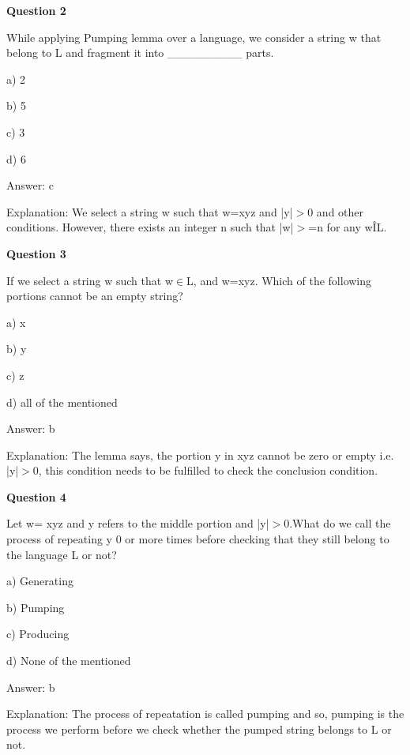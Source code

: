 \documentclass{article}
\begin{document}
\begin{mdframed}[linewidth=1pt, roundcorner=5pt, linecolor=gray!30, backgroundcolor=gray!5]
\textbf{Question 2} 

While applying Pumping lemma over a language, we consider a string w that belong to L and fragment it into \_\_\_\_\_\_\_\_\_ parts.

a) 2

b) 5

c) 3

d) 6
\vspace{5pt} \par
\begin{tcolorbox}[colback=green!5, colframe=green!40!black, title=Solution]
Answer: c

Explanation: We select a string w such that w=xyz and |y|$>$0 and other conditions. However, there exists an integer n such that |w|$>$=n for any wÎL.
\end{tcolorbox}
\end{mdframed}

\begin{mdframed}[linewidth=1pt, roundcorner=5pt, linecolor=gray!30, backgroundcolor=gray!5]
\textbf{Question 3} 

If we select a string w such that w$\in$L, and w=xyz. Which of the following portions cannot be an empty string?

a) x

b) y

c) z

d) all of the mentioned
\vspace{5pt} \par
\begin{tcolorbox}[colback=green!5, colframe=green!40!black, title=Solution]
Answer: b

Explanation: The lemma says, the portion y in xyz cannot be zero or empty i.e. |y|$>$0, this condition needs to be fulfilled to check the conclusion condition.
\end{tcolorbox}
\end{mdframed}
\newpage

\begin{mdframed}[linewidth=1pt, roundcorner=5pt, linecolor=gray!30, backgroundcolor=gray!5]
\textbf{Question 4} 

Let w= xyz and y refers to the middle portion and |y|$>$0.What do we call the process of repeating y 0 or more times before checking that they still belong to the language L or not?

a) Generating

b) Pumping

c) Producing

d) None of the mentioned
\vspace{5pt} \par
\begin{tcolorbox}[colback=green!5, colframe=green!40!black, title=Solution]
Answer: b

Explanation: The process of repeatation is called pumping and so, pumping is the process we perform before we check whether the pumped string belongs to L or not.
\end{tcolorbox}
\end{mdframed}
\end{document}
